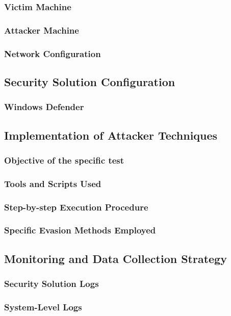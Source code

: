 \documentclass[11pt]{article}
\begin{document}
				\subsubsection{Victim Machine}
				\subsubsection{Attacker Machine}
				\subsubsection{Network Configuration}
			\subsection{Security Solution Configuration}
				\subsubsection{Windows Defender}
			\subsection{Implementation of Attacker Techniques}
				\subsubsection{Objective of the specific test}
				\subsubsection{Tools and Scripts Used}
				\subsubsection{Step-by-step Execution Procedure}
				\subsubsection{Specific Evasion Methods Employed}
			\subsection{Monitoring and Data Collection Strategy}
				\subsubsection{Security Solution Logs}
				\subsubsection{System-Level Logs}
\end{document}
